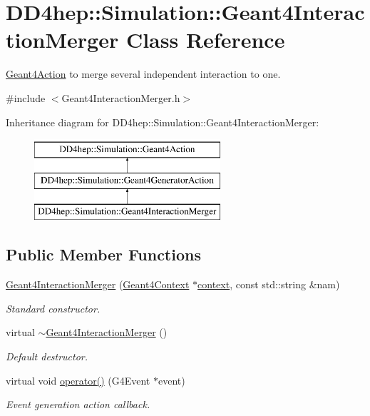 \hypertarget{class_d_d4hep_1_1_simulation_1_1_geant4_interaction_merger}{}\section{D\+D4hep\+:\+:Simulation\+:\+:Geant4\+Interaction\+Merger Class Reference}
\label{class_d_d4hep_1_1_simulation_1_1_geant4_interaction_merger}


\hyperlink{class_d_d4hep_1_1_simulation_1_1_geant4_action}{Geant4\+Action} to merge several independent interaction to one.  




{\ttfamily \#include $<$Geant4\+Interaction\+Merger.\+h$>$}

Inheritance diagram for D\+D4hep\+:\+:Simulation\+:\+:Geant4\+Interaction\+Merger\+:\begin{figure}[H]
\begin{center}
\leavevmode
\includegraphics[height=3.000000cm]{class_d_d4hep_1_1_simulation_1_1_geant4_interaction_merger}
\end{center}
\end{figure}
\subsection*{Public Member Functions}
\begin{DoxyCompactItemize}
\item 
\hyperlink{class_d_d4hep_1_1_simulation_1_1_geant4_interaction_merger_ad80869d9440400a2d4936649441aa0aa}{Geant4\+Interaction\+Merger} (\hyperlink{class_d_d4hep_1_1_simulation_1_1_geant4_context}{Geant4\+Context} $\ast$\hyperlink{class_d_d4hep_1_1_simulation_1_1_geant4_action_aa9d87f0ec2a72b7fc2591b18f98d75cf}{context}, const std\+::string \&nam)
\begin{DoxyCompactList}\small\item\em Standard constructor. \end{DoxyCompactList}\item 
virtual \hyperlink{class_d_d4hep_1_1_simulation_1_1_geant4_interaction_merger_a2ef1b19a45945a77332eb85f2fe2d8bf}{$\sim$\+Geant4\+Interaction\+Merger} ()
\begin{DoxyCompactList}\small\item\em Default destructor. \end{DoxyCompactList}\item 
virtual void \hyperlink{class_d_d4hep_1_1_simulation_1_1_geant4_interaction_merger_a5af2cee708859468f78130560ffa4a6e}{operator()} (G4\+Event $\ast$event)
\begin{DoxyCompactList}\small\item\em Event generation action callback. \end{DoxyCompactList}\end{DoxyCompactItemize}
